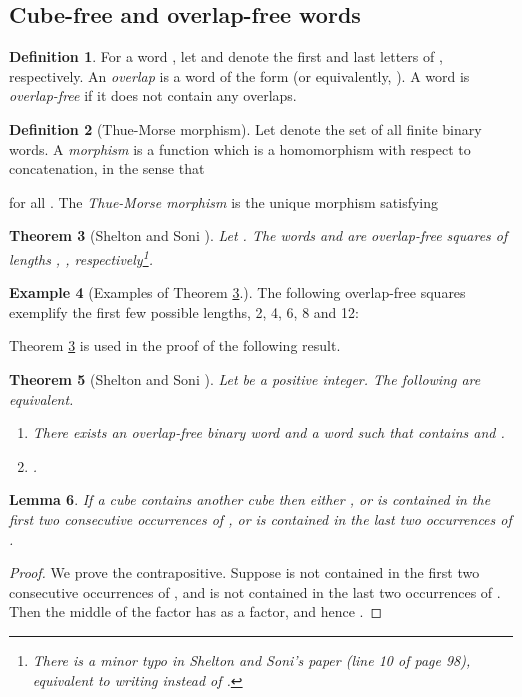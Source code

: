 \documentclass[12pt]{article}
\newcommand{\Cubefree}{Cube-free}
\theoremstyle{plain}
\newtheorem{thm}{Theorem}
\newtheorem{lem}[thm]{Lemma}
\theoremstyle{definition}
\newtheorem{df}[thm]{Definition}
\newtheorem{exa}[thm]{Example}
\theoremstyle{remark}
\begin{document}
		\subsection{{\Cubefree} and overlap-free words}
			\begin{df}
				For a word , let  and  denote the first
				and last letters of , respectively.
				An \emph{overlap} is a word of the form  (or equivalently, ).
				A word  is \emph{overlap-free} if it does not contain any overlaps.
			\end{df}
			\begin{df}[Thue-Morse morphism]
				Let  denote the set of all finite binary words.
				A \emph{morphism} is a function 
				which is a homomorphism with respect to concatenation, in the sense that
				
				for all .
				The \emph{Thue-Morse morphism} is the unique morphism  satisfying
				
			\end{df}
			\begin{thm}[Shelton and Soni \cite{MR787496}]\label{shelton}
				Let .
				The words  and  are overlap-free squares of lengths , , respectively\footnote{
					There is a minor typo in Shelton and Soni's paper (line 10 of page 98),
					equivalent to writing  instead of .
				}.
			\end{thm}
			\begin{exa}[Examples of Theorem \ref{shelton}.]
				The following overlap-free squares exemplify the first few possible lengths, 2, 4, 6, 8 and 12:
				
				
			\end{exa}
			Theorem \ref{shelton} is used in the proof of the following result.
			\begin{thm}[Shelton and Soni \cite{MR787496}]\label{soni}
				Let  be a positive integer. The following are equivalent.
				\begin{enumerate}
					\item There exists an overlap-free binary word  and a word  such that  contains  and .
					\item .
				\end{enumerate}
			\end{thm}
			\begin{lem}\label{cubeContainsCube}
				If a cube  contains another cube  then either
				, or
				 is contained in the first two consecutive occurrences of , or
				 is contained in the last two occurrences of .
			\end{lem}
			\begin{proof}
				We prove the contrapositive. Suppose  is not contained in the first two consecutive occurrences of , and
				 is not contained in the last two occurrences of .
				Then the middle  of the factor  has  as a factor, and hence .
			\end{proof}
\end{document}
